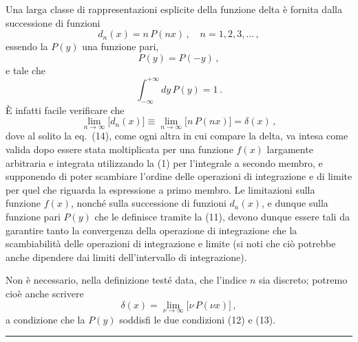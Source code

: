 \documentclass[11pt, a4paper]{book}
\numberwithin{equation}{section}
\begin{document}
Una larga classe di rappresentazioni esplicite della funzione delta è fornita dalla successione di funzioni
\begin{equation}
d_n(x) = n\, P(nx) \,, \quad n = 1, 2, 3, \ldots \,, \tag{11}
\end{equation}
essendo la $P(y)$ una funzione pari,
\begin{equation}
P(y) = P(-y) \,, \tag{12}
\end{equation}
e tale che
\begin{equation}
\int_{-\infty}^{+\infty} dy\, P(y) = 1 \,. \tag{13}
\end{equation}
È infatti facile verificare che
\begin{equation}
\lim_{n \to \infty} \bigl[d_n(x)\bigr] \equiv \lim_{n \to \infty} \bigl[n\, P(nx)\bigr] = \delta(x) \,, \tag{14}
\end{equation}
dove al solito la eq.~(14), come ogni altra in cui compare la delta, va intesa come valida dopo essere stata moltiplicata per una funzione $f(x)$ largamente arbitraria e integrata utilizzando la (1) per l'integrale a secondo membro, e supponendo di poter scambiare l'ordine delle operazioni di integrazione e di limite per quel che riguarda la espressione a primo membro. Le limitazioni sulla funzione $f(x)$, nonché sulla successione di funzioni $d_n(x)$, e dunque sulla funzione pari $P(y)$ che le definisce tramite la (11), devono dunque essere tali da garantire tanto la convergenza della operazione di integrazione che la scambiabilità delle operazioni di integrazione e limite (si noti che ciò potrebbe anche dipendere dai limiti dell'intervallo di integrazione).

Non è necessario, nella definizione testé data, che l'indice $n$ sia discreto; potremo cioè anche scrivere
\begin{equation}
\delta(x) = \lim_{\nu \to \infty} \bigl[\nu\, P(\nu x)\bigr] \,, \tag{15}
\end{equation}
a condizione che la $P(y)$ soddisfi le due condizioni (12) e (13).

\medskip
\noindent\rule{\linewidth}{0.4pt}
\end{document}
